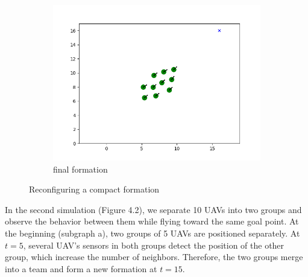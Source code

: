 \begin{figure}[htbp]
\begin{subfigure}[b]{0.3\textwidth}
         \centering
         \includegraphics[width=\textwidth]{figures/reconfigure_3.png}
         \caption{final formation}
         \label{qw}
     \end{subfigure}
        \caption{Reconfiguring a compact formation}
        \label{fig}
\end{figure}


In the second simulation (Figure 4.2), we separate 10 UAVs into two groups and observe the behavior between them while flying toward the same goal point. At the beginning (subgraph a), two groups of 5 UAVs are positioned separately. At $t=5$, several UAV's sensors in both groups detect the position of the other group, which increase the number of neighbors. Therefore, the two groups merge into a team and form a new formation at $t=15$. 

